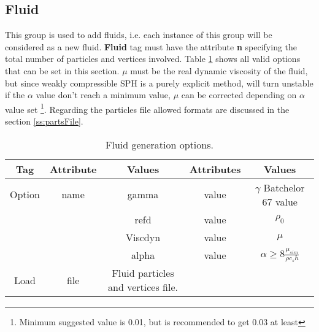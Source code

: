 \subsection{Fluid}
\label{sss:XML:Fluid}
%
This group is used to add fluids, i.e. each instance of this group
will be considered as a new fluid. \textbf{Fluid} tag must have the
attribute \textbf{n} specifying the total number of particles and
vertices involved. Table \ref{tables:caseSetup:Fluid:Options} shows
all valid options that can be set in this section.\rc
%
$\mu$ must be the real dynamic viscosity of the fluid, but since
weakly compressible SPH is a purely explicit method, will turn
unstable if the $\alpha$ value don't reach a minimum value, $\mu$ can
be corrected depending on $\alpha$ value set \footnote{Minimum
suggested value is 0.01, but is recommended to get 0.03 at least}.\rc
%
Regarding the particles file allowed formats are discussed in the
section \ref{ss:partsFile}.
%
\begin{table}[h!b!p!]\small
	\centering
	\begin{tabular}{| c | c | c | c | c | }
		\hline
		\cellcolor[rgb]{0.7,0.7,0.7}Tag & \cellcolor[rgb]{0.7,0.7,0.7}Attribute & \cellcolor[rgb]{0.7,0.7,0.7}Values & \cellcolor[rgb]{0.7,0.7,0.7}Attributes & \cellcolor[rgb]{0.7,0.7,0.7}Values \\
		\hline
		Option & name & gamma              & value & $\gamma$ Batchelor 67 value \\
		\hline
		       &      & refd               & value & $\rho_0$ \\
		\hline
		       &      & Viscdyn            & value & $\mu$ \\
		\hline
		       &      & alpha              & value & $\alpha \geq 8 \frac{\mu_{sim}}{\rho c_s h} $ \\
		\hline
		Load   & file & Fluid particles and vertices file. & & \\
		\hline
	\end{tabular}
	\caption{Fluid generation options.}
	\label{tables:caseSetup:Fluid:Options}
\end{table}
%
